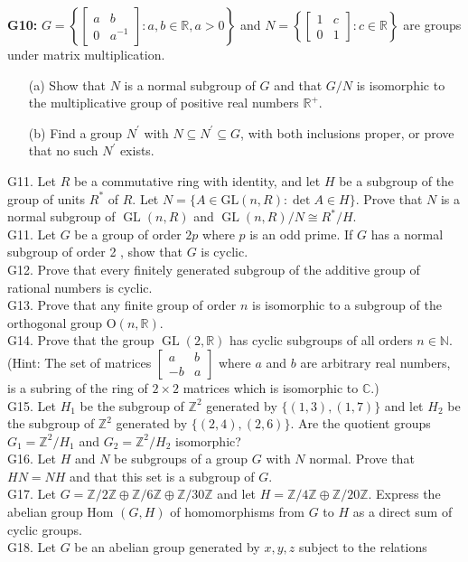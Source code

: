 \textbf{G10:} $G=\left\{\left[\begin{array}{cc}a & b \\ 0 & a^{-1}\end{array}\right]: a, b \in \mathbb{R}, a>0\right\}$ and $N=\left\{\left[\begin{array}{ll}1 & c \\ 0 & 1\end{array}\right]: c \in \mathbb{R}\right\}$ are groups under matrix multiplication.
\begin{itemize}
	\item[(a)] Show that $N$ is a normal subgroup of $G$ and that $G / N$ is isomorphic to the multiplicative group of positive real numbers $\mathbb{R}^{+}$.
	\item[(b)] Find a group $N^{\prime}$ with $N \subseteq N^{\prime} \subseteq G$, with both inclusions proper, or prove that no such $N^{\prime}$ exists.
\end{itemize}



G11. Let $R$ be a commutative ring with identity, and let $H$ be a subgroup of the group of units $R^{*}$ of $R$. Let $N=\{A \in \mathrm{GL}(n, R): \operatorname{det} A \in H\}$. Prove that $N$ is a normal subgroup of $\operatorname{GL}(n, R)$ and $\operatorname{GL}(n, R) / N \cong R^{*} / H$.\\
G11. Let $G$ be a group of order $2 p$ where $p$ is an odd prime. If $G$ has a normal subgroup of order 2 , show that $G$ is cyclic.\\
G12. Prove that every finitely generated subgroup of the additive group of rational numbers is cyclic.\\
G13. Prove that any finite group of order $n$ is isomorphic to a subgroup of the orthogonal group $\mathrm{O}(n, \mathbb{R})$.\\
G14. Prove that the group $\operatorname{GL}(2, \mathbb{R})$ has cyclic subgroups of all orders $n \in \mathbb{N}$. (Hint: The set of matrices $\left[\begin{array}{cc}a & b \\ -b & a\end{array}\right]$ where $a$ and $b$ are arbitrary real numbers, is a subring of the ring of $2 \times 2$ matrices which is isomorphic to $\mathbb{C}$.)\\
G15. Let $H_{1}$ be the subgroup of $\mathbb{Z}^{2}$ generated by $\{(1,3),(1,7)\}$ and let $H_{2}$ be the subgroup of $\mathbb{Z}^{2}$ generated by $\{(2,4),(2,6)\}$. Are the quotient groups $G_{1}=\mathbb{Z}^{2} / H_{1}$ and $G_{2}=\mathbb{Z}^{2} / H_{2}$ isomorphic?\\
G16. Let $H$ and $N$ be subgroups of a group $G$ with $N$ normal. Prove that $H N=N H$ and that this set is a subgroup of $G$.\\
G17. Let $G=\mathbb{Z} / 2 \mathbb{Z} \oplus \mathbb{Z} / 6 \mathbb{Z} \oplus \mathbb{Z} / 30 \mathbb{Z}$ and let $H=\mathbb{Z} / 4 \mathbb{Z} \oplus \mathbb{Z} / 20 \mathbb{Z}$. Express the abelian group Hom $(G, H)$ of homomorphisms from $G$ to $H$ as a direct sum of cyclic groups.\\
G18. Let $G$ be an abelian group generated by $x, y, z$ subject to the relations

